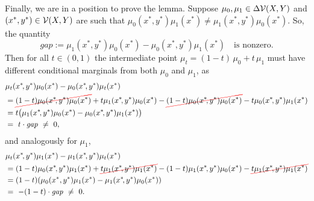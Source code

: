 \begin{lproof}
    Finally, we are in a position to prove the lemma.  
    Suppose $\mu_0,\mu_1 \in \Delta\mathcal V(X,Y)$ and $(x^*,y^*) \in \mathcal V(X,Y)$ 
    are such that $\mu_0(x^*,y^*) \mu_1(x^*)  \ne \mu_1(x^*,y^*) \mu_0(x^*)$.
    So, the quantity
    \[
        \mathit{gap} := \mu_1(x^*,y^*) \mu_0(x^*) - \mu_0(x^*,y^*) \mu_1(x^*) 
        \quad\text{is nonzero}.
    \]
    Then for all $t \in (0,1)$ the intermediate point $\mu_t = (1-t)\, \mu_0 + t\, \mu_1$ must have different conditional marginals from both $\mu_0$ and $\mu_1$, as
    \begin{align*}
        &\mu_t(x^*\!,y^*)\mu_0(x^*) - \mu_0(x^*\!,y^*) \mu_t(x^*) \\
            &= \Cancel{(1-t)\mu_0(x^*\!,y^*)\mu_0(x^*)} + t \mu_1(x^*\!,y^*)\mu_0(x^*)
                -  \Cancel{(1-t)\mu_0(x^*\!,y^*) \mu_0(x^*)} - t\mu_0(x^*\!,y^*) \mu_1(x^*) \\
            &= t \pqty[\big] { \mu_1(x^*\!,y^*)\mu_0(x^*) -\mu_0(x^*\!,y^*) \mu_1(x^*)}
            \\
            &=~ t \cdot \mathit{gap}
            ~\ne~ 0,
    \end{align*}
    and analogously for $\mu_1$,
    \begin{align*}
        &\mu_t(x^*\!,y^*)\mu_1(x^*) - \mu_1(x^*\!,y^*) \mu_t(x^*) \\
            &= (1-t)\mu_0(x^*\!,y^*)\mu_1(x^*) + {\color{red}\cancel{\color{black} t \mu_1(x^*\!,y^*)\mu_1(x^*) }}
                -  (1-t)\mu_1(x^*\!,y^*) \mu_0(x^*) - {\color{red}\cancel{\color{black} t\mu_1(x^*\!,y^*) \mu_1(x^*) }} \\
            &= (1-t) (\mu_0(x^*,y^*)\mu_1(x^*) -\mu_1(x^*\!,y^*) \mu_0(x^*)) 
            \\
            &=~ -(1-t) \cdot \mathit{gap}
            ~\ne~ 0.
    \end{align*}
    

\end{lproof}
